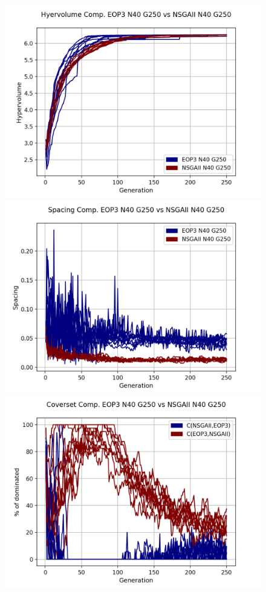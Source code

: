 \begin{figure}[H]
\centering
\includegraphics[scale=0.35]{../METRICS_PLOTS/Hypervol_COMP_EOP3N40G250_NSGAIIN40G250.png}
\includegraphics[scale=0.35]{../METRICS_PLOTS/Spacing_COMP_EOP3N40G250_NSGAIIN40G250.png}
\includegraphics[scale=0.35]{../METRICS_PLOTS/CoverSet_COMP_EOP3N40G250_NSGAIIN40G250.png}\\

\end{figure}
